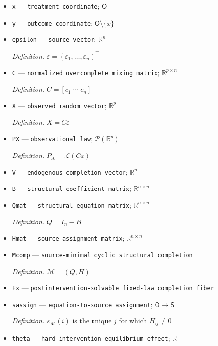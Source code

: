 \documentclass{article}
\begin{document}
\begin{itemize}
  \item \texttt{x} --- \texttt{treatment coordinate}; \(\mathsf O\)
  \item \texttt{y} --- \texttt{outcome coordinate}; \(\mathsf O\setminus\{x\}\)
  \item \texttt{epsilon} --- \texttt{source vector}; \(\mathbb R^n\)
  \par\smallskip\noindent\emph{Definition.} \(\varepsilon=(\varepsilon_1,\ldots,\varepsilon_n)^\top\)
  \item \texttt{C} --- \texttt{normalized overcomplete mixing matrix}; \(\mathbb R^{p\times n}\)
  \par\smallskip\noindent\emph{Definition.} \(C=[c_1\;\cdots\;c_n]\)
  \item \texttt{X} --- \texttt{observed random vector}; \(\mathbb R^p\)
  \par\smallskip\noindent\emph{Definition.} \(X=C\varepsilon\)
  \item \texttt{PX} --- \texttt{observational law}; \(\mathcal P(\mathbb R^p)\)
  \par\smallskip\noindent\emph{Definition.} \(P_X=\mathcal L(C\varepsilon)\)
  \item \texttt{V} --- \texttt{endogenous completion vector}; \(\mathbb R^n\)
  \item \texttt{B} --- \texttt{structural coefficient matrix}; \(\mathbb R^{n\times n}\)
  \item \texttt{Qmat} --- \texttt{structural equation matrix}; \(\mathbb R^{n\times n}\)
  \par\smallskip\noindent\emph{Definition.} \(Q=I_n-B\)
  \item \texttt{Hmat} --- \texttt{source-\allowbreak{}assignment matrix}; \(\mathbb R^{n\times n}\)
  \item \texttt{Mcomp} --- \texttt{source-\allowbreak{}minimal cyclic structural completion}
  \par\smallskip\noindent\emph{Definition.} \(\mathcal M=(Q,H)\)
  \item \texttt{Fx} --- \texttt{postintervention-\allowbreak{}solvable fixed-\allowbreak{}law completion fiber}
  \item \texttt{sassign} --- \texttt{equation-\allowbreak{}to-\allowbreak{}source assignment}; \(\mathsf O\to\mathsf S\)
  \par\smallskip\noindent\emph{Definition.} \(s_{\mathcal M}(i)\) is the unique \(j\) for which \(H_{ij}\ne0\)
  \item \texttt{theta} --- \texttt{hard-\allowbreak{}intervention equilibrium effect}; \(\mathbb R\)

\end{itemize}
\end{document}
